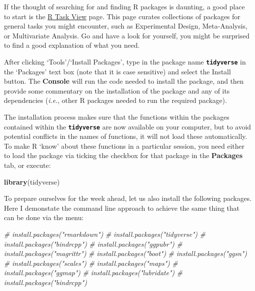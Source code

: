 \documentclass[
]{book}
\newenvironment{Shaded}{\begin{snugshade}}{\end{snugshade}}
\newcommand{\CommentTok}[1]{\textcolor[rgb]{0.56,0.35,0.01}{\textit{#1}}}
\newcommand{\KeywordTok}[1]{\textcolor[rgb]{0.13,0.29,0.53}{\textbf{#1}}}
\newcommand{\NormalTok}[1]{#1}
\begin{document}
If the thought of searching for and finding R packages is daunting, a good place to start is the \href{http://cran.r-project.org/web/views/}{R Task View} page. This page curates collections of packages for general tasks you might encounter, such as Experimental Design, Meta-Analysis, or Multivariate Analysis. Go and have a look for yourself, you might be surprised to find a good explanation of what you need.

After clicking `Tools'/`Install Packages', type in the package name \textbf{\texttt{tidyverse}} in the `Packages' text box (note that it is case sensitive) and select the Install button. The \textbf{Console} will run the code needed to install the package, and then provide some commentary on the installation of the package and any of its dependencies (\emph{i.e.}, other R packages needed to run the required package).

The installation process makes sure that the functions within the packages contained within the \textbf{\texttt{tidyverse}} are now available on your computer, but to avoid potential conflicts in the names of functions, it will not load these automatically. To make R `know' about these functions in a particular session, you need either to load the package via ticking the checkbox for that package in the \textbf{Packages} tab, or execute:

\begin{Shaded}
\begin{Highlighting}[]
\KeywordTok{library}\NormalTok{(tidyverse)}
\end{Highlighting}
\end{Shaded}

To prepare ourselves for the week ahead, let us also install the following packages. Here I demonstate the command line approach to achieve the same thing that can be done via the menu:

\begin{Shaded}
\begin{Highlighting}[]
\CommentTok{\# install.packages("rmarkdown")}
\CommentTok{\# install.packages("tidyverse")}
\CommentTok{\# install.packages("bindrcpp")}
\CommentTok{\# install.packages("ggpubr")}
\CommentTok{\# install.packages("magrittr")}
\CommentTok{\# install.packages("boot")}
\CommentTok{\# install.packages("ggsn")}
\CommentTok{\# install.packages("scales")}
\CommentTok{\# install.packages("maps")}
\CommentTok{\# install.packages("ggmap")}
\CommentTok{\# install.packages("lubridate")}
\CommentTok{\# install.packages("bindrcpp")}
\end{Highlighting}
\end{Shaded}
\end{document}

